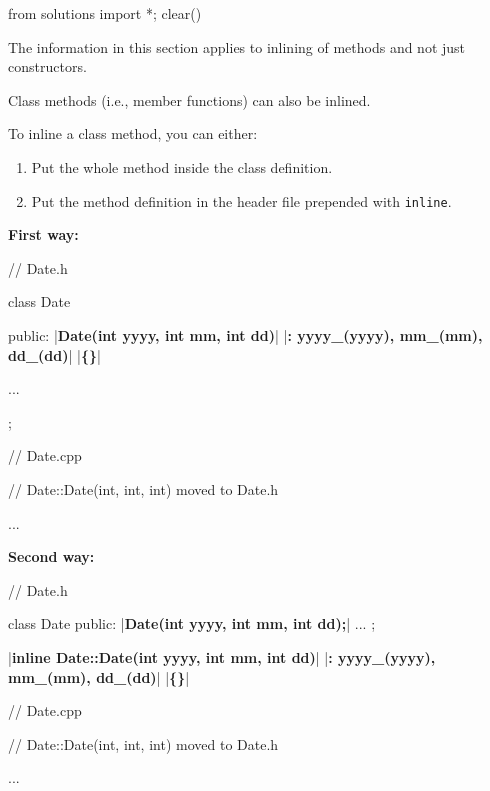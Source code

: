 \begin{python0}
from solutions import *; clear()
\end{python0}

The information in this section applies to inlining of methods and not
just constructors.

Class methods (i.e., member functions) can also be inlined.

To inline a class method, you can either:

\begin{enumerate}
\item Put the whole method inside the class definition.
\item Put the method definition in the header file prepended with
  \texttt{inline}.
\end{enumerate}

\textbf{First way:}

\begin{consolethree}[escapeinside=||]
// Date.h

class Date
{
public:
    |\textbf{Date(int yyyy, int mm, int dd)}|
        |\textbf{: yyyy\_(yyyy), mm\_(mm), dd\_(dd)}|
    |\textbf{\{\}}|

    ...
};
\end{consolethree}

\begin{consolethree}[escapeinside=||]
// Date.cpp

// Date::Date(int, int, int) moved to Date.h

...
\end{consolethree}

\textbf{Second way:}

\begin{consolethree}[escapeinside=||]
// Date.h

class Date
{
public:
    |\textbf{Date(int yyyy, int mm, int dd);}|
    ...
};

|\textbf{inline Date::Date(int yyyy, int mm, int dd)}|
    |\textbf{: yyyy\_(yyyy), mm\_(mm), dd\_(dd)}|
|\textbf{\{\}}|
\end{consolethree}

\begin{consolethree}[escapeinside=||]
// Date.cpp

// Date::Date(int, int, int) moved to Date.h

...
\end{consolethree}





